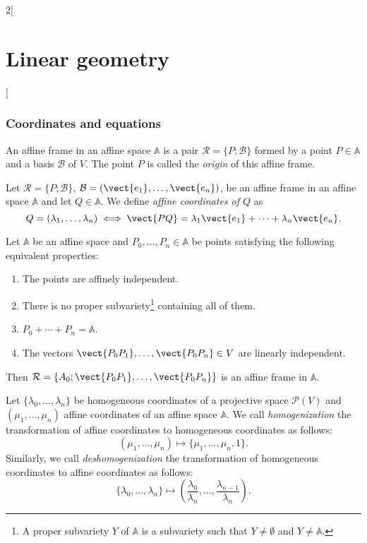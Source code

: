 \documentclass[../../../main.tex]{subfiles}
\begin{document}
\begin{multicols}{2}[\section{Linear geometry}]
\subsubsection*{Coordinates and equations}
\begin{definition}
An affine frame in an affine space $\mathbb{A}$ is a pair $\mathcal{R}=\{P;\mathcal{B}\}$ formed by a point $P\in\mathbb{A}$ and a basis $\mathcal{B}$ of $V$. The point $P$ is called the \textit{origin} of this affine frame.
\end{definition}
\begin{definition}
Let $\mathcal{R}=\{P;\mathcal{B}\}$, $\mathcal{B}=(\vect{e_1},\ldots,\vect{e_n})$, be an affine frame in an affine space $\mathbb{A}$ and let $Q\in\mathbb{A}$. We define \textit{affine coordinates of $Q$} as $$Q=(\lambda_1,\ldots,\lambda_n)\iff\vect{PQ}=\lambda_1\vect{e_1}+\cdots+\lambda_n\vect{e_n}.$$
\end{definition}
\begin{prop}
Let $\mathbb{A}$ be an affine space and $P_0,\ldots,P_n\in\mathbb{A}$ be points satisfying the following equivalent properties:
\begin{enumerate}
    \item The points are affinely independent.
    \item There is no proper subvariety\footnote{A proper subvariety $Y$ of $\mathbb{A}$ is a subvariety such that $Y\ne\emptyset$ and  $Y\ne\mathbb{A}$.} containing all of them.
    \item $P_0+\cdots+P_n=\mathbb{A}$.
    \item The vectors $\vect{P_0P_1},\ldots,\vect{P_0P_n}\in V$ are linearly independent.
\end{enumerate}
Then $\mathcal{R}=\{A_0;\vect{P_0P_1},\ldots,\vect{P_0P_n}\}$ is an affine frame in $\mathbb{A}$.
\end{prop}
\begin{definition}
Let $\{\lambda_0,\ldots,\lambda_n\}$ be homogeneous coordinates of a projective space $\mathcal{P}(V)$ and $(\mu_1,\ldots,\mu_n)$ affine coordinates of an affine space $\mathbb{A}$. We call \textit{homogenization} the transformation of affine coordinates to homogeneous coordinates as follows: $$(\mu_1,\ldots,\mu_n)\mapsto\{\mu_1,\ldots,\mu_n,1\}.$$ Similarly, we call \textit{deshomogenization} the transformation of homogeneous coordinates to affine coordinates as follows: $$\{\lambda_0,\ldots,\lambda_n\}\mapsto\left(\frac{\lambda_0}{\lambda_n},\ldots,\frac{\lambda_{n-1}}{\lambda_n}\right).$$
\end{definition}

\end{multicols}
\end{document}
